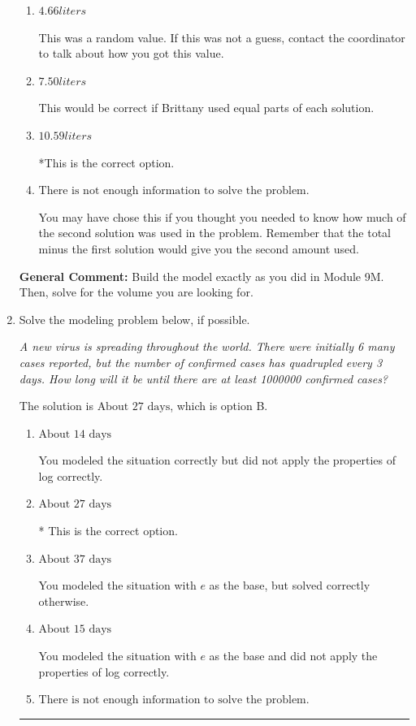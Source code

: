 \documentclass{extbook}[14pt]
\newcommand{\litem}[1]{\item #1

\rule{\textwidth}{0.4pt}}
\begin{document}
\begin{enumerate}
{\begin{enumerate}[label=\Alph*.]
This is the concentration of 26 percent solution.
\item \( 4.66 liters \)

This was a random value. If this was not a guess, contact the coordinator to talk about how you got this value.
\item \( 7.50 liters \)

This would be correct if Brittany used equal parts of each solution.
\item \( 10.59 liters \)

*This is the correct option.
\item \( \text{There is not enough information to solve the problem.} \)

You may have chose this if you thought you needed to know how much of the second solution was used in the problem. Remember that the total minus the first solution would give you the second amount used.
\end{enumerate}

\textbf{General Comment:} Build the model exactly as you did in Module 9M. Then, solve for the volume you are looking for.
}
\litem{
Solve the modeling problem below, if possible.

\begin{center}
    \textit{ A new virus is spreading throughout the world. There were initially 6 many cases reported, but the number of confirmed cases has quadrupled every 3 days. How long will it be until there are at least 1000000 confirmed cases? }
\end{center}
The solution is \( \text{About } 27 \text{ days} \), which is option B.\begin{enumerate}[label=\Alph*.]
\item \( \text{About } 14 \text{ days} \)

You modeled the situation correctly but did not apply the properties of log correctly.
\item \( \text{About } 27 \text{ days} \)

* This is the correct option.
\item \( \text{About } 37 \text{ days} \)

You modeled the situation with $e$ as the base, but solved correctly otherwise.
\item \( \text{About } 15 \text{ days} \)

You modeled the situation with $e$ as the base and did not apply the properties of log correctly.
\item \( \text{There is not enough information to solve the problem.} \)


\end{enumerate}}
\end{enumerate}
\end{document}
